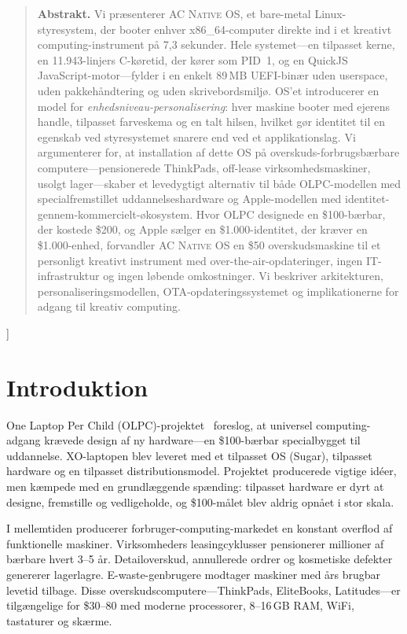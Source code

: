 \documentclass[10pt,letterpaper,twocolumn]{article}
\newcommand{\acos}{\textsc{AC Native OS}}
\begin{document}
{\begin{quote}
\small\noindent\textbf{Abstrakt.}
Vi præsenterer \acos{}, et bare-metal Linux-styresystem, der booter enhver x86\_64-computer direkte ind i et kreativt computing-instrument på 7,3 sekunder. Hele systemet---en tilpasset kerne, en 11.943-linjers C-køretid, der kører som PID~1, og en QuickJS JavaScript-motor---fylder i en enkelt 89\,MB UEFI-binær uden userspace, uden pakkehåndtering og uden skrivebordsmiljø. OS'et introducerer en model for \emph{enhedsniveau-personalisering}: hver maskine booter med ejerens handle, tilpasset farveskema og en talt hilsen, hvilket gør identitet til en egenskab ved styresystemet snarere end ved et applikationslag. Vi argumenterer for, at installation af dette OS på overskuds-forbrugsbærbare computere---pensionerede ThinkPads, off-lease virksomhedsmaskiner, usolgt lager---skaber et levedygtigt alternativ til både OLPC-modellen med specialfremstillet uddannelseshardware og Apple-modellen med identitet-gennem-kommercielt-økosystem. Hvor OLPC designede en \$100-bærbar, der kostede \$200, og Apple sælger en \$1.000-identitet, der kræver en \$1.000-enhed, forvandler \acos{} en \$50 overskudsmaskine til et personligt kreativt instrument med over-the-air-opdateringer, ingen IT-infrastruktur og ingen løbende omkostninger. Vi beskriver arkitekturen, personaliseringsmodellen, OTA-opdateringssystemet og implikationerne for adgang til kreativ computing.
\end{quote}
\vspace{0.5em}
}]

\section{Introduktion}

One Laptop Per Child (OLPC)-projektet~\citep{negroponte1995being, kraemer2009olpc} foreslog, at universel computing-adgang krævede design af ny hardware---en \$100-bærbar specialbygget til uddannelse. XO-laptopen blev leveret med et tilpasset OS (Sugar), tilpasset hardware og en tilpasset distributionsmodel. Projektet producerede vigtige idéer, men kæmpede med en grundlæggende spænding: tilpasset hardware er dyrt at designe, fremstille og vedligeholde, og \$100-målet blev aldrig opnået i stor skala.

I mellemtiden producerer forbruger-computing-markedet en konstant overflod af funktionelle maskiner. Virksomheders leasingcyklusser pensionerer millioner af bærbare hvert 3--5 år. Detailoverskud, annullerede ordrer og kosmetiske defekter genererer lagerlagre. E-waste-genbrugere modtager maskiner med års brugbar levetid tilbage. Disse overskudscomputere---ThinkPads, EliteBooks, Latitudes---er tilgængelige for \$30--80 med moderne processorer, 8--16\,GB RAM, WiFi, tastaturer og skærme.
\end{document}

